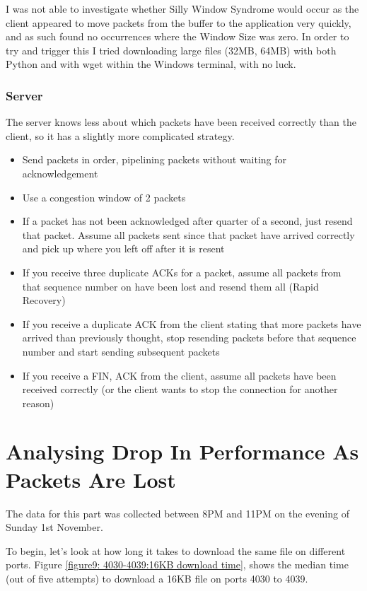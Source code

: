 \documentclass[12pt]{article}
\begin{document}
I was not able to investigate whether Silly Window Syndrome would occur as the client appeared to move packets from the buffer to the application very quickly, and as such found no occurrences where the Window Size was zero.
In order to try and trigger this I tried downloading large files (32MB, 64MB) with both Python and with wget within the Windows terminal, with no luck.

\subsubsection*{Server}
The server knows less about which packets have been received correctly than the client, so it has a slightly more complicated strategy.
\begin{itemize}
  \item Send packets in order, pipelining packets without waiting for acknowledgement
  \item Use a congestion window of 2 packets
  \item If a packet has not been acknowledged after quarter of a second, just resend that packet. Assume all packets sent since that packet have arrived correctly and pick up where you left off after it is resent
  \item If you receive three duplicate ACKs for a packet, assume all packets from that sequence number on have been lost and resend them all (Rapid Recovery)
  \item If you receive a duplicate ACK from the client stating that more packets have arrived than previously thought, stop resending packets before that sequence number and start sending subsequent packets
  \item If you receive a FIN, ACK from the client, assume all packets have been received correctly (or the client wants to stop the connection for another reason)
\end{itemize}

\section{Analysing Drop In Performance As Packets Are Lost}
The data for this part was collected between 8PM and 11PM on the evening of Sunday 1st November.

To begin, let's look at how long it takes to download the same file on different ports.
Figure \ref{figure9: 4030-4039:16KB download time}, shows the median time (out of five attempts) to download a 16KB file on ports 4030 to 4039. 
\end{document}
